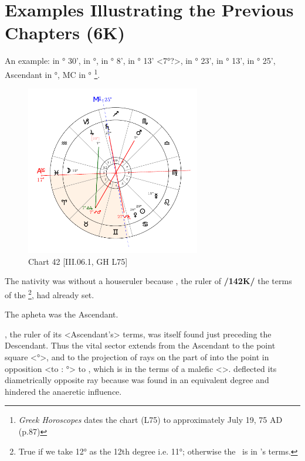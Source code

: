 \section{Examples Illustrating the Previous Chapters (6K)}

An example: \Sun\xspace in \Cancer\xspace 29° 30', \Moon\xspace in \Pisces\xspace 12°, \Saturn\xspace in \Sagittarius\xspace 27° 8', \Jupiter\xspace in \Capricorn\xspace 22° 13' <7°?>, \Mars\xspace in \Scorpio\xspace 7° 23', \Venus\xspace in \Cancer\xspace 28° 13', \Mercury\xspace in \Leo\xspace 11° 25',
Ascendant in \Pisces\xspace 17°, MC in \Sagittarius\xspace 25°
\footnote{\textit{Greek Horoscopes} dates the chart (L75) to approximately July 19, 75 AD (p.87)}. 

\clearpage
\begin{figure}
\centering
\vspace{-20pt}
\includegraphics[width=0.68\textwidth]{charts/3_06_1}
\caption{Chart 42 [III.06.1, GH L75]}
\label{fig:chart42}
\end{figure} 

\noindent The nativity was without a houseruler because \Venus,
the ruler of \textbf{/142K/} the terms of the \Moon\footnote{True if we take 12° as the 12th degree i.e. 11°; otherwise the \Moon\, is in \Jupiter's terms.}, had already set. 

The apheta was the Ascendant. 

\noindent \Mercury, the ruler of its <Ascendant’s> terms, was itself found just preceding the Descendant. Thus the vital sector
extends from the Ascendant to the point square <\Gemini\xspace 17°>, and to the projection of rays on the part of \Saturn\xspace into the point in opposition <to \Saturn: °> to \Saturn, which is in the terms of a malefic <\Saturn>. \Mars\xspace deflected its diametrically opposite ray because \Jupiter\xspace was found in an equivalent degree and hindered the anaeretic influence. 

